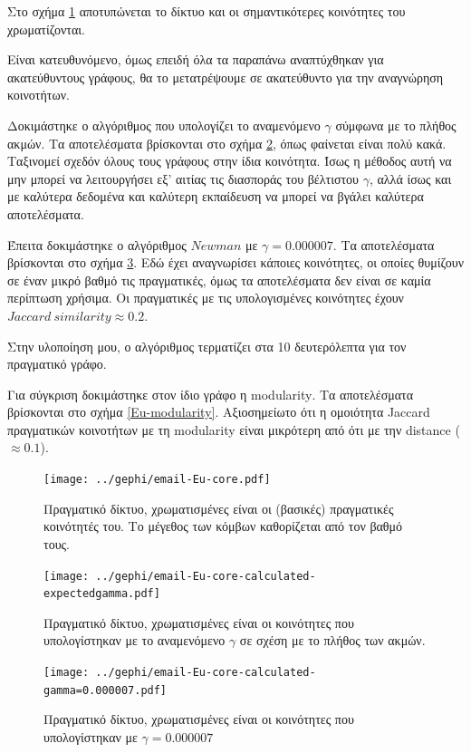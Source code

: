 \documentclass[10pt, letterpaper]{article}
\begin{document}
Στο σχήμα \ref{Eu-real} αποτυπώνεται το δίκτυο και οι σημαντικότερες κοινότητες του 
χρωματίζονται.


Είναι κατευθυνόμενο, όμως επειδή όλα τα παραπάνω αναπτύχθηκαν για ακατεύθυντους γράφους,
θα το μετατρέψουμε σε ακατεύθυντο για την αναγνώρηση κοινοτήτων.


Δοκιμάστηκε ο αλγόριθμος που υπολογίζει το αναμενόμενο $\gamma$ σύμφωνα με το πλήθος 
ακμών. Τα αποτελέσματα βρίσκονται στο σχήμα \ref{Eu-expected}, όπως φαίνεται είναι πολύ κακά.
Ταξινομεί σχεδόν όλους τους γράφους στην ίδια κοινότητα.
Ίσως η μέθοδος αυτή να μην μπορεί να λειτουργήσει εξ' αιτίας τις διασποράς του βέλτιστου 
$\gamma$, αλλά ίσως και με καλύτερα δεδομένα και καλύτερη εκπαίδευση να μπορεί να βγάλει καλύτερα
αποτελέσματα.


Έπειτα δοκιμάστηκε ο αλγόριθμος $Newman$ με $\gamma = 0.000007$. Τα αποτελέσματα βρίσκονται 
στο σχήμα \ref{Eu-gamma}. Εδώ έχει αναγνωρίσει κάποιες κοινότητες, οι οποίες θυμίζουν σε έναν 
μικρό βαθμό τις πραγματικές, όμως τα αποτελέσματα δεν είναι σε καμία περίπτωση 
χρήσιμα. Οι πραγματικές με τις υπολογισμένες κοινότητες έχουν $Jaccard \ similarity \approx 0.2$.

Στην υλοποίηση μου, ο αλγόριθμος τερματίζει στα 10 δευτερόλεπτα για τον πραγματικό γράφο.

Για σύγκριση δοκιμάστηκε στον ίδιο γράφο η \textlatin{modularity}. Τα αποτελέσματα βρίσκονται στο σχήμα 
\ref{Eu-modularity}.
Αξιοσημείωτο ότι η ομοιότητα \textlatin{Jaccard} πραγματικών κοινοτήτων με τη \textlatin{modularity} είναι μικρότερη 
από ότι με την \textlatin{distance} ($\approx 0.1$). 



\begin{figure}
  \centering
  \texttt{[image: ../gephi/email-Eu-core.pdf]}
  \caption{Πραγματικό δίκτυο, χρωματισμένες είναι οι (βασικές) πραγματικές κοινότητές του.
  Το μέγεθος των κόμβων καθορίζεται από τον βαθμό τους.}
  \label{Eu-real}
\end{figure}


\begin{figure}
  \centering
  \texttt{[image: ../gephi/email-Eu-core-calculated-expectedgamma.pdf]}
  \caption{Πραγματικό δίκτυο, χρωματισμένες είναι οι κοινότητες που υπολογίστηκαν με το 
  αναμενόμενο $\gamma$ σε σχέση με το πλήθος των ακμών.}
  \label{Eu-expected}
\end{figure}

\begin{figure}
  \centering
  \texttt{[image: ../gephi/email-Eu-core-calculated-gamma=0.000007.pdf]}
  \caption{Πραγματικό δίκτυο, χρωματισμένες είναι οι κοινότητες που υπολογίστηκαν με $\gamma = 0.000007$}
  \label{Eu-gamma}
\end{figure}
\end{document}
